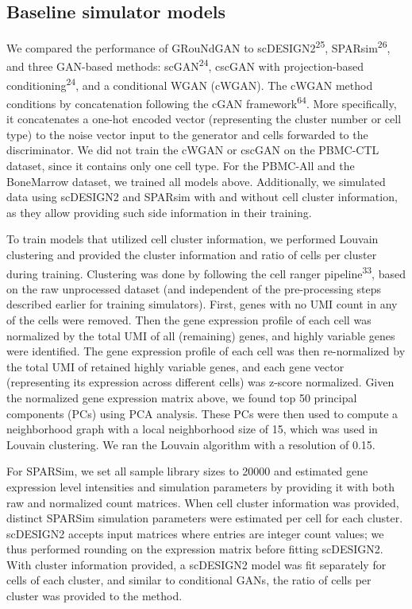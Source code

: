 \subsection*{Baseline simulator models}

We compared the performance of GRouNdGAN to scDESIGN2\textsuperscript{25}, SPARsim\textsuperscript{26}, and three GAN-based methods: scGAN\textsuperscript{24}, cscGAN with projection-based conditioning\textsuperscript{24}, and a conditional WGAN (cWGAN). The cWGAN method conditions by concatenation following the cGAN framework\textsuperscript{64}. More specifically, it concatenates a one-hot encoded vector (representing the cluster number or cell type) to the noise vector input to the generator and cells forwarded to the discriminator. We did not train the cWGAN or cscGAN on the PBMC-CTL dataset, since it contains only one cell type. For the PBMC-All and the BoneMarrow dataset, we trained all models above. Additionally, we simulated data using scDESIGN2 and SPARsim with and without cell cluster information, as they allow providing such side information in their training.

To train models that utilized cell cluster information, we performed Louvain clustering and provided the cluster information and ratio of cells per cluster during training. Clustering was done by following the cell ranger pipeline\textsuperscript{33}, based on the raw unprocessed dataset (and independent of the pre-processing steps described earlier for training simulators). First, genes with no UMI count in any of the cells were removed. Then the gene expression profile of each cell was normalized by the total UMI of all (remaining) genes, and highly variable genes were identified. The gene expression profile of each cell was then re-normalized by the total UMI of retained highly variable genes, and each gene vector (representing its expression across different cells) was z-score normalized. Given the normalized gene expression matrix above, we found top 50 principal components (PCs) using PCA analysis. These PCs were then used to compute a neighborhood graph with a local neighborhood size of 15, which was used in Louvain clustering. We ran the Louvain algorithm with a resolution of 0.15.

For SPARSim, we set all sample library sizes to 20000 and estimated gene expression level intensities and simulation parameters by providing it with both raw and normalized count matrices. When cell cluster information was provided, distinct SPARSim simulation parameters were estimated per cell for each cluster. scDESIGN2 accepts input matrices where entries are integer count values; we thus performed rounding on the expression matrix before fitting scDESIGN2. With cluster information provided, a scDESIGN2 model was fit separately for cells of each cluster, and similar to conditional GANs, the ratio of cells per cluster was provided to the method.

